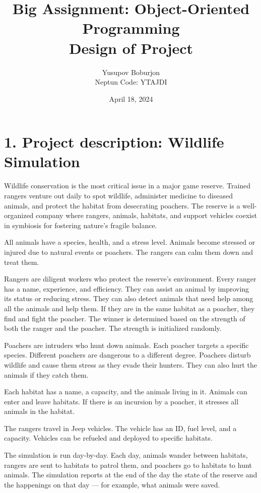 \documentclass[a4paper,12pt]{article}
\title{Big Assignment: Object-Oriented Programming\\\large Design of Project}
\author{Yusupov Boburjon\\Neptun Code: YTAJDI}
\date{April 18, 2024}
\begin{document}
\maketitle

\newpage

\section*{1. Project description: Wildlife Simulation}

Wildlife conservation is the most critical issue in a major game reserve.  
Trained rangers venture out daily to spot wildlife, administer medicine to diseased animals, and protect the habitat from desecrating poachers. The reserve is a well-organized company where rangers, animals, habitats, and support vehicles coexist in symbiosis for fostering nature’s fragile balance.

All animals have a species, health, and a stress level. Animals become stressed or injured due to natural events or poachers. The rangers can calm them down and treat them.

Rangers are diligent workers who protect the reserve’s environment. Every ranger has a name, experience, and efficiency. They can assist an animal by improving its status or reducing stress. They can also detect animals that need help among all the animals and help them. If they are in the same habitat as a poacher, they find and fight the poacher. The winner is determined based on the strength of both the ranger and the poacher. The strength is initialized randomly.

Poachers are intruders who hunt down animals. Each poacher targets a specific species. Different poachers are dangerous to a different degree. Poachers disturb wildlife and cause them stress as they evade their hunters. They can also hurt the animals if they catch them.

Each habitat has a name, a capacity, and the animals living in it. Animals can enter and leave habitats. If there is an incursion by a poacher, it stresses all animals in the habitat.

The rangers travel in Jeep vehicles. The vehicle has an ID, fuel level, and a capacity. Vehicles can be refueled and deployed to specific habitats.

The simulation is run day-by-day. Each day, animals wander between habitats, rangers are sent to habitats to patrol them, and poachers go to habitats to hunt animals. The simulation reports at the end of the day the state of the reserve and the happenings on that day — for example, what animals were saved.
\end{document}
